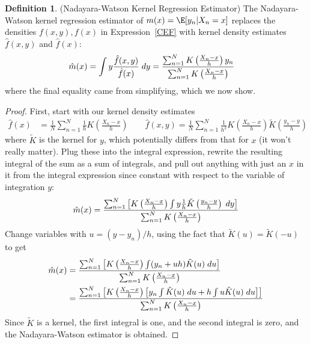 \documentclass[12pt]{article}
\theoremstyle{plain}
\theoremstyle{definition}
\newtheorem{defn}[thm]{Definition}
\theoremstyle{remark}
\newcommand{\sumnN}{\sum^N_{n=1}}
\begin{document}
\begin{defn}{(Nadayara-Watson Kernel Regression Estimator)}
The Nadayara-Watson kernel regression estimator of $m(x)=\E[y_n|X_n=x]$
replaces the densities $f(x,y),f(x)$ in Expression~\ref{CEF} with kernel
density estimates $\hat{f}(x,y)$ and $\hat{f}(x)$:
\begin{align*}
  \hat{m}(x)
  &=
  \int
  y\frac{\hat{f}(x,y)}{\hat{f}(x)}
  \;dy
  =
  \frac{%
    \sumnN
    K\left(
    \frac{X_n-x}{h}
    \right)
    y_n
  }{%
    \sumnN
    K\left( \frac{X_n-x}{h}
    \right)
  }
\end{align*}
where the final equality came from simplifying, which we now show.
\end{defn}
\begin{proof}
First, start with our kernel density estimates
\begin{align*}
  \hat{f}(x)
  &=
  \frac{1}{N}
  \sumnN
  \frac{1}{h}
  K\left(
  \frac{X_n-x}{h}
  \right)
  \qquad
  \hat{f}(x,y)
  =
  \frac{1}{N}
  \sumnN
  \frac{1}{h^2}
  K\left(
  \frac{X_n-x}{h}
  \right)
  \tilde{K}\left(
  \frac{y_n-y}{h}
  \right)
\end{align*}
where $\tilde{K}$ is the kernel for $y$, which potentially differs from
that for $x$ (it won't really matter).
Plug these into the integral expression, rewrite the resulting integral
of the sum as a sum of integrals, and pull out anything with just an $x$
in it from the integral expression since constant with respect to the
variable of integration $y$:
\begin{align*}
  \hat{m}(x)
  =
  \frac{%
    \sumnN
    \left[
    K\left(
    \frac{X_n-x}{h}
    \right)
    \int
    y
    \frac{1}{h}
    \tilde{K}\left(
    \frac{y_n-y}{h}
    \right)
    \;dy
    \right]
  }{%
    \sumnN
    K\left(
    \frac{X_n-x}{h}
    \right)
  }
\end{align*}
Change variables with $u=(y-y_n)/h$, using the fact that
$\tilde{K}(u)=\tilde{K}(-u)$ to get
\begin{align*}
  \hat{m}(x)
  &=
  \frac{%
    \sumnN
    \left[
    K\left(
    \frac{X_n-x}{h}
    \right)
    \int
    (y_n+uh)
    \tilde{K}(u)
    \;du
    \right]
  }{%
    \sumnN
    K\left(
    \frac{X_n-x}{h}
    \right)
  }
  \\
  &=
  \frac{%
    \sumnN
    \left[
    K\left(
    \frac{X_n-x}{h}
    \right)
    \left[
    y_n
    \int
    \tilde{K}(u)
    \;du
    +
    h
    \int
    u
    \tilde{K}(u)
    \;du
    \right]
    \right]
  }{%
    \sumnN
    K\left(
    \frac{X_n-x}{h}
    \right)
  }
\end{align*}
Since $\tilde{K}$ is a kernel, the first integral is one, and the second
integral is zero, and the Nadayara-Watson estimator is obtained.
\end{proof}
\end{document}
